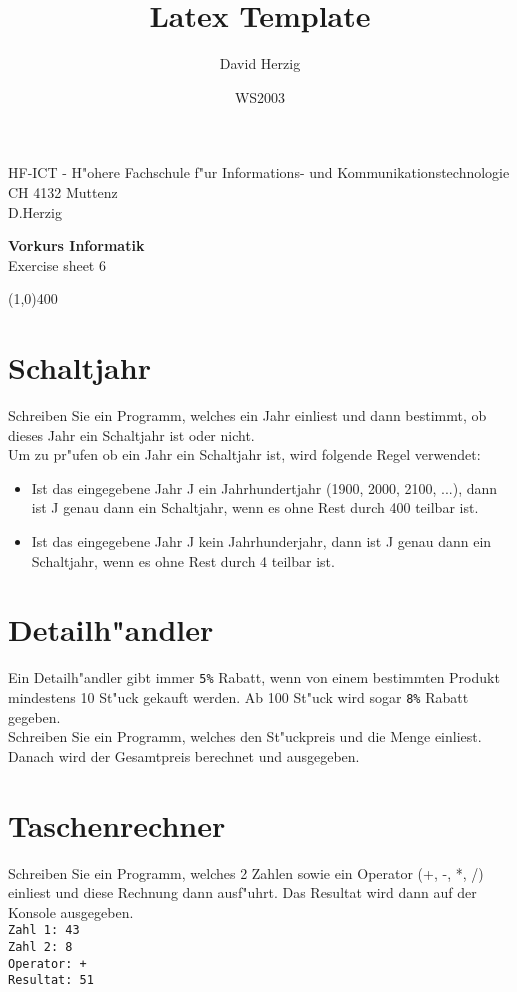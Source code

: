 \documentclass[a4paper,10pt]{article}
\title{Latex Template}
\author{David Herzig}
\date{WS2003}
\begin{document}
HF-ICT - H"ohere Fachschule f"ur Informations- und Kommunikationstechnologie\\
CH 4132 Muttenz\\
D.Herzig

\vspace{2mm}

\begin{center}
{\Large \bf Vorkurs Informatik}\\
Exercise sheet 6
\end{center}

\vspace{2mm}

\line(1,0){400}

\vspace{5mm}

\section{Schaltjahr}
Schreiben Sie ein Programm, welches ein Jahr einliest und dann bestimmt, ob dieses
Jahr ein Schaltjahr ist oder nicht.\\
Um zu pr"ufen ob ein Jahr ein Schaltjahr ist, wird folgende Regel verwendet:
\begin{itemize}
\item Ist das eingegebene Jahr J ein Jahrhundertjahr (1900, 2000, 2100, ...), dann ist J genau dann ein Schaltjahr,
wenn es ohne Rest durch 400 teilbar ist.
\item Ist das eingegebene Jahr J kein Jahrhunderjahr, dann ist J genau dann ein Schaltjahr, wenn es ohne Rest
durch 4 teilbar ist.
\end{itemize}

\section{Detailh"andler}
Ein Detailh"andler gibt immer \verb|5%| Rabatt, wenn von einem bestimmten Produkt mindestens 10 St"uck gekauft
werden. Ab 100 St"uck wird sogar \verb|8%| Rabatt gegeben.\\
Schreiben Sie ein Programm, welches den St"uckpreis und die Menge einliest. Danach wird der Gesamtpreis berechnet
und ausgegeben.

\section{Taschenrechner}
Schreiben Sie ein Programm, welches 2 Zahlen sowie ein Operator (+, -, *, /) einliest und diese Rechnung dann ausf"uhrt.
Das Resultat wird dann auf der Konsole ausgegeben.\\

\verb|Zahl 1: 43|\\
\verb|Zahl 2: 8|\\
\verb|Operator: +|\\
\verb|Resultat: 51|
\end{document}
